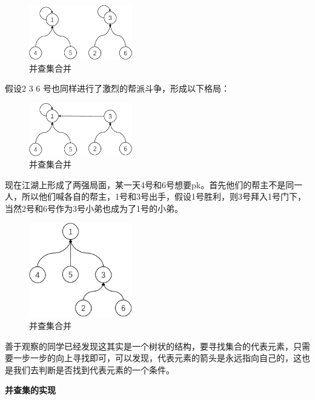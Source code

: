 \documentclass[lang=cn,newtx,10pt,scheme=chinese]{../elegantbook}
\begin{document}
\begin{figure}[!htbp]
  \centering
  \includegraphics[width=0.4\textwidth]{./figure/pdf/cropped/unionFindExample(c).pdf}
  \caption{并查集合并}
  \label{fig:unionFind3}
\end{figure}

假设2 3 6 号也同样进行了激烈的帮派斗争，形成以下格局：

\begin{figure}[!htbp]
  \centering
  \includegraphics[width=0.4\textwidth]{./figure/pdf/cropped/unionFindExample(d).pdf}
  \caption{并查集合并}
  \label{fig:unionFind4}
\end{figure}

现在江湖上形成了两强局面，某一天4号和6号想要pk。首先他们的帮主不是同一人，所以他们喊各自的帮主，1号和3号出手，假设1号胜利，则3号拜入1号门下，当然2号和6号作为3号小弟也成为了1号的小弟。

\begin{figure}[!htbp]
  \centering
  \includegraphics[width=0.4\textwidth]{./figure/pdf/cropped/unionFindExample(e).pdf}
  \caption{并查集合并}
  \label{fig:unionFind5}
\end{figure}

善于观察的同学已经发现这其实是一个树状的结构，要寻找集合的代表元素，只需要一步一步的向上寻找即可，可以发现，代表元素的箭头是永远指向自己的，这也是我们去判断是否找到代表元素的一个条件。

\textbf{并查集的实现}
\end{document}
